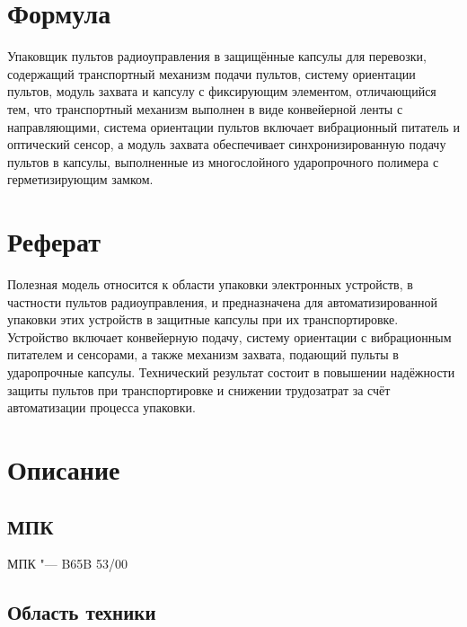 \documentclass{bsuir}
\begin{document}
\maketitle
\mainmatter


\addtocounter{page}{2}

\section{Формула}

Упаковщик пультов радиоуправления в защищённые капсулы для перевозки, содержащий транспортный механизм подачи пультов,
систему ориентации пультов, модуль захвата и капсулу с фиксирующим элементом, отличающийся тем, что транспортный
механизм выполнен в виде конвейерной ленты с направляющими, система ориентации пультов включает вибрационный питатель и
оптический сенсор, а модуль захвата обеспечивает синхронизированную подачу пультов в капсулы, выполненные из
многослойного ударопрочного полимера с герметизирующим замком.

\section{Реферат}

Полезная модель относится к области упаковки электронных устройств, в частности пультов радиоуправления, и предназначена
для автоматизированной упаковки этих устройств в защитные капсулы при их транспортировке. Устройство включает
конвейерную подачу, систему ориентации с вибрационным питателем и сенсорами, а также механизм захвата, подающий пульты в
ударопрочные капсулы. Технический результат состоит в повышении надёжности защиты пультов при транспортировке и снижении
трудозатрат за счёт автоматизации процесса упаковки.

\section{Описание}

\subsection{МПК} МПК "--- B65B 53/00

\subsection*{Область техники}
\end{document}
